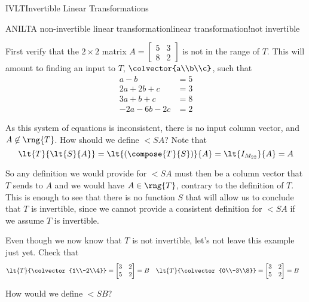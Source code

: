 \begin{subsect}{IVLT}{Invertible Linear Transformations}
\begin{example}{ANILT}{A non-invertible linear transformation}{linear transformation!not invertible}
%
\begin{para}First verify that the $2\times 2$ matrix
$A=\begin{bmatrix}
5&3\\8&2
\end{bmatrix}
$
is not in the range of $T$.  This will amount to finding an input to $T$, $\colvector{a\\b\\c}$, such that
%
\begin{align*}
a-b&=5\\
2a+2b+c&=3\\
3a+b+c&=8\\
-2a-6b-2c&=2
\end{align*}
\end{para}
%
\begin{para}As this system of equations is inconsistent, there is no input column vector, and $A\not\in\rng{T}$.  How should we define $\lt{S}{A}$?  Note that
%
\begin{equation*}
\lt{T}{\lt{S}{A}}=\lt{\left(\compose{T}{S}\right)}{A}=
\lt{I_{M_{22}}}{A}=A
\end{equation*}
\end{para}
%
\begin{para}So any definition we would provide for $\lt{S}{A}$ must then be a column vector that $T$ sends to $A$ and we would have $A\in\rng{T}$, contrary to the definition of $T$.  This is enough to see that there is no function $S$ that will allow us to conclude that $T$ is invertible, since we cannot provide a consistent definition for $\lt{S}{A}$ if we assume $T$ is invertible.\end{para}
%
\begin{para}Even though we now know that $T$ is not invertible, let's not leave this example just yet.  Check that
%
\begin{align*}
\lt{T}{\colvector{1\\-2\\4}}&=\begin{bmatrix}3&2\\5&2\end{bmatrix}=B&
\lt{T}{\colvector{0\\-3\\8}}&=\begin{bmatrix}3&2\\5&2\end{bmatrix}=B
\end{align*}
\end{para}
%
\begin{para}How would we define $\lt{S}{B}$?

\end{para}
\end{example}
\end{subsect}

